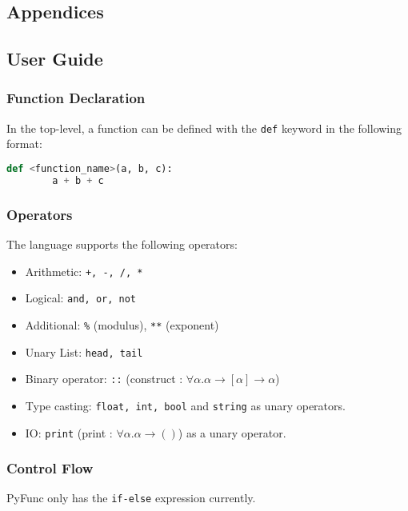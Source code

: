 \documentclass{l4proj}
\begin{document}
\begin{appendices}

\chapter{Appendices}
\label{chp:appendix}

\section{User Guide}

\subsection{Function Declaration}

In the top-level, a function can be defined with the \texttt{def} keyword in the following format:

\begin{lstlisting}[language=Python]
    def <function_name>(a, b, c):
        a + b + c
\end{lstlisting}

\subsection{Operators}
The language supports the following operators:
\begin{itemize}
    \item Arithmetic: \texttt{+, -, /, *}
    \item Logical: \texttt{and, or, not}
    \item Additional: \texttt{\%} (modulus), \texttt{**} (exponent)
    \item Unary List: \texttt{head, tail}
    \item Binary operator: \texttt{::} (construct : $\forall \alpha . \alpha \rightarrow [\alpha] \rightarrow \alpha$)
    \item Type casting: \texttt{float, int, bool} and \texttt{string} as unary operators.
    \item IO: \texttt{print} (print : $\forall \alpha . \alpha \rightarrow ()$) as a unary operator.
\end{itemize}

\subsection{Control Flow}
PyFunc only has the \texttt{if-else} expression currently.


\end{appendices}
\end{document}
